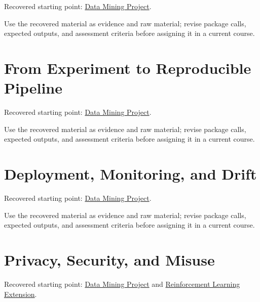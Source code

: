 \documentclass[
  letterpaper,
]{scrbook}
\begin{document}

Recovered starting point: \hyperref[sec-lab-data-mining-project]{Data
Mining Project}.

Use the recovered material as evidence and raw material; revise package
calls, expected outputs, and assessment criteria before assigning it in
a current course.

\section*{From Experiment to Reproducible
Pipeline}\label{sec-pr-16-from-experiment-to-reproducible-pipeline}


Recovered starting point: \hyperref[sec-lab-data-mining-project]{Data
Mining Project}.

Use the recovered material as evidence and raw material; revise package
calls, expected outputs, and assessment criteria before assigning it in
a current course.

\section*{Deployment, Monitoring, and
Drift}\label{sec-pr-16-deployment-monitoring-and-drift}


Recovered starting point: \hyperref[sec-lab-data-mining-project]{Data
Mining Project}.

Use the recovered material as evidence and raw material; revise package
calls, expected outputs, and assessment criteria before assigning it in
a current course.

\section*{Privacy, Security, and
Misuse}\label{sec-pr-16-privacy-security-and-misuse}


Recovered starting point: \hyperref[sec-lab-data-mining-project]{Data
Mining Project} and
\hyperref[sec-lab-reinforcement-learning-extension]{Reinforcement
Learning Extension}.
\end{document}
